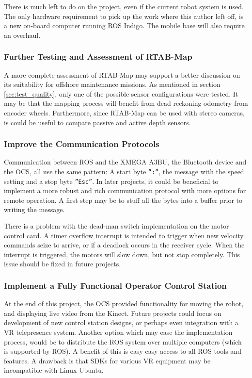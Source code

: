 There is much left to do on the project, even if the current robot system is used. The only hardware requirement to pick up the work where this author left off, is a new on-board computer running \ac{ROS} Indigo. The mobile base will also require an overhaul.

\subsubsection{Further Testing and Assessment of \ac{RTAB-Map}}

A more complete assessment of \ac{RTAB-Map} may support a better discussion on its suitability for offshore maintenance missions. As mentioned in section \ref{sec:test_quality}, only one of the possible sensor configurations were tested. It may be that the mapping process will benefit from dead reckoning odometry from encoder wheels. Furthermore, since \ac{RTAB-Map} can be used with stereo cameras, is could be useful to compare passive and active depth sensors.

\subsubsection{Improve the Communication Protocols}

Communication between \ac{ROS} and the XMEGA A3BU, the Bluetooth device and the \ac{OCS}, all use the same pattern: A start byte \texttt{'':''}, the message with the speed setting and a stop byte \texttt{''Esc''}. In later projects, it could be beneficial to implement a more robust and rich communication protocol with more options for remote operation. A first step may be to stuff all the bytes into a buffer prior to writing the message.

There is a problem with the dead-man switch implementation on the motor control card. A timer overflow interrupt is intended to trigger when new velocity commands seize to arrive, or if a deadlock occurs in the receiver cycle. When the interrupt is triggered, the motors will slow down, but not stop completely. This issue should be fixed in future projects.

\subsubsection{Implement a Fully Functional Operator Control Station}

At the end of this project, the \ac{OCS} provided functionality for moving the robot, and displaying live video from the Kinect. Future projects could focus on development of new control station designs, or perhaps even integration with a \ac{VR} telepresence system. Another option which may ease the implementation process, would be to distribute the \ac{ROS} system over multiple computers (which is supported by \ac{ROS}). A benefit of this is easy easy access to all \ac{ROS} tools and features. A drawback is that SDKs for various \ac{VR} equipment may be incompatible with Linux Ubuntu. 

